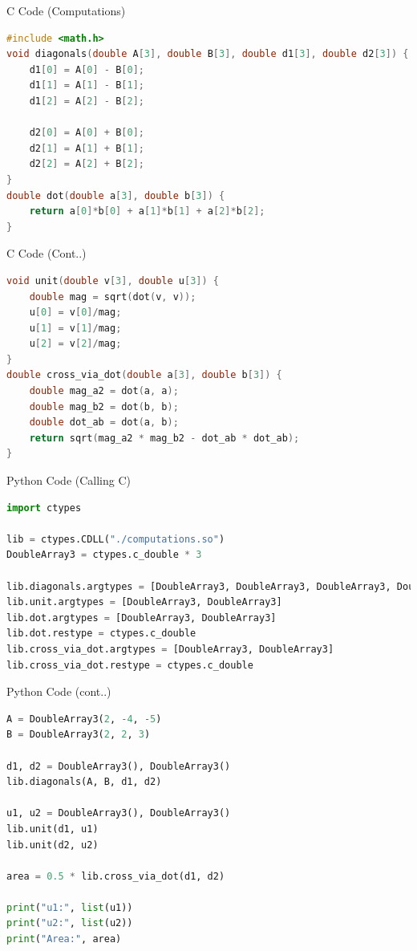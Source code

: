\documentclass{beamer}
\begin{document}

\begin{frame}[fragile]{C Code (Computations)}
\begin{lstlisting}[language=C]
#include <math.h>
void diagonals(double A[3], double B[3], double d1[3], double d2[3]) {
    d1[0] = A[0] - B[0];
    d1[1] = A[1] - B[1];
    d1[2] = A[2] - B[2];

    d2[0] = A[0] + B[0];
    d2[1] = A[1] + B[1];
    d2[2] = A[2] + B[2];
}
double dot(double a[3], double b[3]) {
    return a[0]*b[0] + a[1]*b[1] + a[2]*b[2];
}
\end{lstlisting}
\end{frame}

\begin{frame}[fragile]{C Code (Cont..)}
\begin{lstlisting}[language=C]
void unit(double v[3], double u[3]) {
    double mag = sqrt(dot(v, v));
    u[0] = v[0]/mag;
    u[1] = v[1]/mag;
    u[2] = v[2]/mag;
}
double cross_via_dot(double a[3], double b[3]) {
    double mag_a2 = dot(a, a);
    double mag_b2 = dot(b, b);
    double dot_ab = dot(a, b);
    return sqrt(mag_a2 * mag_b2 - dot_ab * dot_ab);
}
\end{lstlisting}
\end{frame}


\begin{frame}[fragile]{Python Code (Calling C)}
\begin{lstlisting}[language=Python]
import ctypes

lib = ctypes.CDLL("./computations.so")
DoubleArray3 = ctypes.c_double * 3

lib.diagonals.argtypes = [DoubleArray3, DoubleArray3, DoubleArray3, DoubleArray3]
lib.unit.argtypes = [DoubleArray3, DoubleArray3]
lib.dot.argtypes = [DoubleArray3, DoubleArray3]
lib.dot.restype = ctypes.c_double
lib.cross_via_dot.argtypes = [DoubleArray3, DoubleArray3]
lib.cross_via_dot.restype = ctypes.c_double
\end{lstlisting}
\end{frame}


\begin{frame}[fragile]{Python Code (cont..)}
\begin{lstlisting}[language=Python]
A = DoubleArray3(2, -4, -5)
B = DoubleArray3(2, 2, 3)

d1, d2 = DoubleArray3(), DoubleArray3()
lib.diagonals(A, B, d1, d2)

u1, u2 = DoubleArray3(), DoubleArray3()
lib.unit(d1, u1)
lib.unit(d2, u2)

area = 0.5 * lib.cross_via_dot(d1, d2)

print("u1:", list(u1))
print("u2:", list(u2))
print("Area:", area)
\end{lstlisting}
\end{frame}
\end{document}
